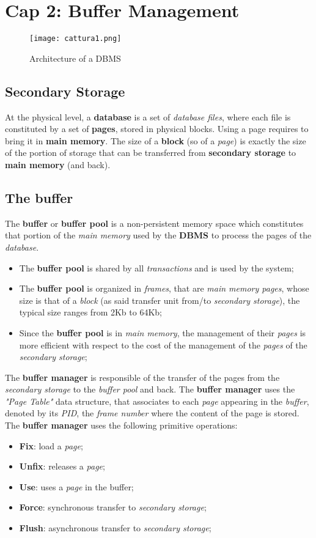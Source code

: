 \documentclass{article}
\begin{document}
\section{Cap 2: Buffer Management}
\begin{figure}[H]
  \centering
  \texttt{[image: cattura1.png]}
  \caption{Architecture of a DBMS}
\end{figure}
\subsection{Secondary Storage}
At the physical level, a \textbf{database} is a set of \emph{database files}, where each file is constituted by a set of \textbf{pages}, stored in physical blocks. Using a page requires to bring it in\textbf{ main memory}. The size of a \textbf{block} (so of a \emph{page}) is exactly the size of the portion of storage that can be transferred from \textbf{secondary storage} to \textbf{main memory} (and back). 
\subsection{The buffer}
The \textbf{buffer} or \textbf{buffer pool} is a non-persistent memory space which constitutes that portion of the \emph{main memory} used by the \textbf{DBMS} to process the pages of the \emph{database}.
\begin{itemize}
\item The \textbf{buffer pool} is shared by all \emph{transactions} and is used by the system;
\item The \textbf{buffer pool} is organized in \emph{frames}, that are \emph{main memory pages}, whose size is that of a \emph{block} (as said transfer unit from/to \emph{secondary storage}), the typical size ranges from 2Kb to 64Kb;
\item Since the \textbf{buffer pool }is in \emph{main memory}, the management of their \emph{pages} is more efficient with respect to the cost of the management of the \emph{pages} of the \emph{secondary storage};
\end{itemize}
 The \textbf{buffer manager} is responsible of the transfer of the pages from the\emph{ secondary storage} to the \emph{buffer pool} and back. The \textbf{buffer manager} uses the \emph{"Page Table"} data structure, that associates to each \emph{page} appearing in the \emph{buffer}, denoted by its \emph{PID}, the\emph{ frame number} where the content of the page is stored. The \textbf{buffer manager} uses the following primitive operations:\begin{itemize}
\item \textbf{Fix}: load a \emph{page};
\item \textbf{Unfix}: releases a \emph{page};
\item \textbf{Use}: uses a \emph{page} in the buffer;
\item \textbf{Force}: synchronous transfer to \emph{secondary storage};
\item \textbf{Flush}: asynchronous transfer to \emph{secondary storage};
\end{itemize}
\end{document}
